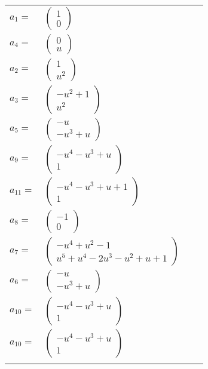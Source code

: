 \documentclass[1p]{elsarticle_modified}
\theoremstyle{definition}
\begin{document}
\begin{tabular}{m{7pt} m{180pt} m{7pt} m{180pt} }
\flushright $a_{1}=$&$\begin{pmatrix}1\\0\end{pmatrix}$ \\
\flushright $a_{4}=$&$\begin{pmatrix}0\\u\end{pmatrix}$ \\
\flushright $a_{2}=$&$\begin{pmatrix}1\\u^2\end{pmatrix}$ \\
\flushright $a_{3}=$&$\begin{pmatrix}- u^2+1\\u^2\end{pmatrix}$ \\
\flushright $a_{5}=$&$\begin{pmatrix}- u\\- u^3+u\end{pmatrix}$ \\
\flushright $a_{9}=$&$\begin{pmatrix}- u^4- u^3+u\\1\end{pmatrix}$ \\
\flushright $a_{11}=$&$\begin{pmatrix}- u^4- u^3+u+1\\1\end{pmatrix}$ \\
\flushright $a_{8}=$&$\begin{pmatrix}-1\\0\end{pmatrix}$ \\
\flushright $a_{7}=$&$\begin{pmatrix}- u^4+u^2-1\\u^5+u^4-2 u^3- u^2+u+1\end{pmatrix}$ \\
\flushright $a_{6}=$&$\begin{pmatrix}- u\\- u^3+u\end{pmatrix}$ \\
\flushright $a_{10}=$&$\begin{pmatrix}- u^4- u^3+u\\1\end{pmatrix}$\\ \flushright $a_{10}=$&$\begin{pmatrix}- u^4- u^3+u\\1\end{pmatrix}$\\&\end{tabular}
\end{document}
